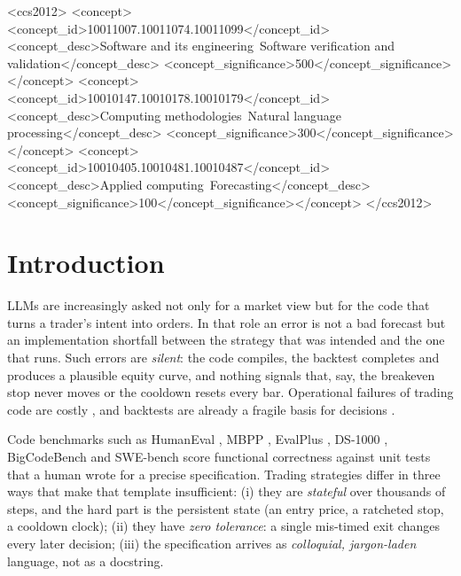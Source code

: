 \documentclass[sigconf,anonymous,review]{acmart}
\begin{document}
\begin{CCSXML}
<ccs2012>
<concept><concept_id>10011007.10011074.10011099</concept_id>
<concept_desc>Software and its engineering~Software verification and validation</concept_desc>
<concept_significance>500</concept_significance></concept>
<concept><concept_id>10010147.10010178.10010179</concept_id>
<concept_desc>Computing methodologies~Natural language processing</concept_desc>
<concept_significance>300</concept_significance></concept>
<concept><concept_id>10010405.10010481.10010487</concept_id>
<concept_desc>Applied computing~Forecasting</concept_desc>
<concept_significance>100</concept_significance></concept>
</ccs2012>
\end{CCSXML}

\maketitle

\section{Introduction}
LLMs are increasingly asked not only for a market view \cite{lopezlira2023chatgpt,wu2023bloomberggpt,yang2023fingpt}
but for the code that turns a trader's intent into orders. In that role an error is not a bad
forecast but an implementation shortfall \cite{perold1988implementation} between the strategy that
was intended and the one that runs. Such errors are \emph{silent}: the code compiles, the backtest
completes and produces a plausible equity curve, and nothing signals that, say, the breakeven stop
never moves or the cooldown resets every bar. Operational failures of trading code are costly
\cite{sec2013knight}, and backtests are already a fragile basis for decisions \cite{bailey2014pseudo,bailey2016pbo}.

Code benchmarks such as HumanEval \cite{chen2021humaneval}, MBPP \cite{austin2021mbpp},
EvalPlus \cite{liu2023evalplus}, DS-1000 \cite{lai2023ds1000}, BigCodeBench \cite{zhuo2024bigcodebench}
and SWE-bench \cite{jimenez2024swebench} score functional correctness against unit tests that a
human wrote for a precise specification. Trading strategies differ in three ways that make that
template insufficient: (i) they are \emph{stateful} over thousands of steps, and the hard part is
the persistent state (an entry price, a ratcheted stop, a cooldown clock); (ii) they have
\emph{zero tolerance}: a single mis-timed exit changes every later decision; (iii) the
specification arrives as \emph{colloquial, jargon-laden} language, not as a docstring.
\end{document}
